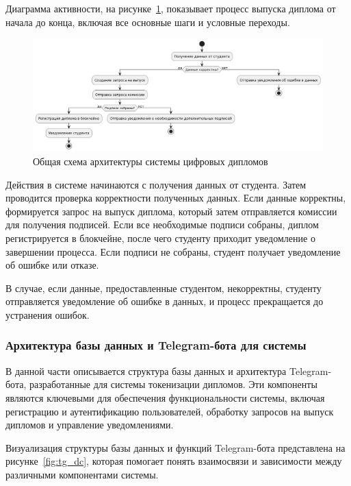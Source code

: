Диаграмма активности, на рисунке~\ref{fig:ifcs}, показывает процесс выпуска диплома от начала до конца, включая все основные шаги и условные переходы.
\begin{figure}[H]
	\centering
	\includegraphics[width=.9\textwidth]{images/ifcs.png}
	\parskip=6pt
	\caption{Общая схема архитектуры системы цифровых дипломов}
	\label{fig:ifcs}
\end{figure}

Действия в системе начинаются с получения данных от студента. Затем проводится проверка корректности полученных данных. Если данные корректны, формируется запрос на выпуск диплома, который затем отправляется комиссии для получения подписей. Если все необходимые подписи собраны, диплом регистрируется в блокчейне, после чего студенту приходит уведомление о завершении процесса. Если подписи не собраны, студент получает уведомление об ошибке или отказе.

В случае, если данные, предоставленные студентом, некорректны, студенту отправляется уведомление об ошибке в данных, и процесс прекращается до устранения ошибок.

\subsubsection{Архитектура базы данных и Telegram-бота для системы}

В данной части описывается структура базы данных и архитектура Telegram-бота, разработанные для системы токенизации дипломов. Эти компоненты являются ключевыми для обеспечения функциональности системы, включая регистрацию и аутентификацию пользователей, обработку запросов на выпуск дипломов и управление уведомлениями.

Визуализация структуры базы данных и функций Telegram-бота представлена на рисунке~\ref{fig:tg_dc}, которая помогает понять взаимосвязи и зависимости между различными компонентами системы.

